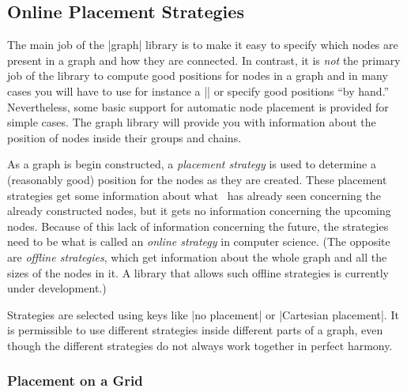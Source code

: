 \subsection{Online Placement Strategies}
\label{section-library-graphs-placement}

The main job of the |graph| library is to make it easy to specify
which nodes are present in a graph and how they are connected. In
contrast, it is \emph{not} the primary job of the library to compute
good positions for nodes in a graph and in many cases you will have to
use for instance a |\matrix| or specify good positions ``by hand.''
Nevertheless, some basic support for automatic node placement is
provided for simple cases. The graph library will provide you with
information about the position of nodes inside their groups and
chains. 


As a graph is begin constructed, a \emph{placement strategy} is used
to determine a (reasonably good) position for the nodes as they are
created. These placement strategies get some information about what
\tikzname\ has already seen concerning the already constructed nodes,
but it gets no information concerning the upcoming nodes. Because of
this lack of information concerning the future, the strategies need to
be what is called an \emph{online strategy} in computer science. (The
opposite are \emph{offline strategies}, which get information about
the whole graph and all the sizes of the nodes in it. A library that
allows such offline strategies is currently under development.)

Strategies are selected using keys like |no placement| or
|Cartesian placement|. It is permissible to use different strategies inside
different parts of a graph, even though the different strategies do
not always work together in perfect harmony.


\subsubsection{Placement on a Grid}

